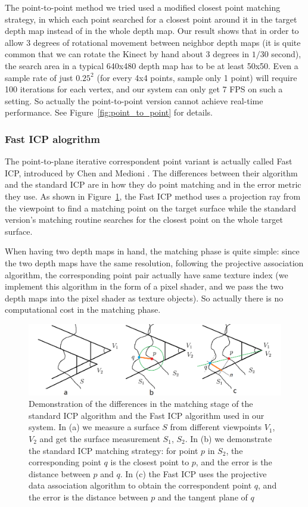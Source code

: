 \documentclass[12pt]{article}
\begin{document}
The point-to-point method we tried used a modified closest point matching strategy, in which each point searched for a closest point around it in the target depth map instead of in the whole depth map. Our result shows that in order to allow 3 degrees of rotational movement between neighbor depth maps (it is quite common that we can rotate the Kinect by hand about 3 degrees in $1/30$ second), the search area in a typical 640x480 depth map has to be at least 50x50. Even a sample rate of just $0.25^2$ (for every 4x4 points, sample only 1 point) will require 100 iterations for each vertex, and our system can only get 7 FPS on such a setting. So actually the point-to-point version cannot achieve real-time performance. See Figure~\ref{fig:point_to_point} for details.

\subsubsection{Fast ICP alogrithm}
The point-to-plane iterative correspondent point variant is actually called Fast ICP, introduced by Chen and Medioni \cite{Chen1991}. The differences between their algorithm and the standard ICP are in how they do point matching and in the error metric they use. As shown in Figure~\ref{fig:ICP_matching}, the Fast ICP method uses a projection ray from the viewpoint to find a matching point on the target surface while the standard version's matching routine searches for the closest point on the whole target surface. 

When having two depth maps in hand, the matching phase is quite simple: since the two depth maps have the same resolution, following the projective association algorithm, the corresponding point pair actually have same texture index (we implement this algorithm in the form of a pixel shader, and we pass the two depth maps into the pixel shader as texture objects). So actually there is no computational cost in the matching phase.

\begin{figure}[h!]
\includegraphics[width=\textwidth]{ICP_matching.png}
\caption{\label{fig:ICP_matching}Demonstration of the differences in the matching stage of the standard ICP algorithm and the Fast ICP algorithm used in our system. In (a) we measure a surface $S$ from different viewpoints $V_1$, $V_2$ and get the surface measurement $S_1$, $S_2$. In (b) we demonstrate the standard ICP matching strategy: for point $p$ in $S_2$, the corresponding point $q$ is the closest point to $p$, and the error is the distance between $p$ and $q$. In (c) the Fast ICP uses the projective data association algorithm \cite{Chen1991} to obtain the correspondent point $q$, and the error is the distance between $p$ and the tangent plane of $q$ }
\end{figure}
\end{document}
